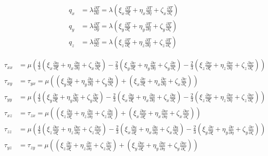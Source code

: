 \begin{align*}
q_x&=\lambda\frac{\partial T}{\partial x}=\lambda \left(\xi_x\frac{\partial T}{\partial \xi}+\eta_x\frac{\partial T}{\partial \eta}+\zeta_x\frac{\partial T}{\partial \zeta}\right)
\\
q_y&=\lambda\frac{\partial T}{\partial y}=\lambda \left(\xi_y\frac{\partial T}{\partial \xi}+\eta_y\frac{\partial T}{\partial \eta}+\zeta_y\frac{\partial T}{\partial \zeta}\right)
\\
q_z&=\lambda\frac{\partial T}{\partial z}=\lambda \left(\xi_z\frac{\partial T}{\partial \xi}+\eta_z\frac{\partial T}{\partial \eta}+\zeta_z\frac{\partial T}{\partial \zeta}\right)
\end{align*}

\begin{align*}
\tau_{xx}&=
\mu \left(\frac{4}{3}\left(\xi_x\frac{\partial u}{\partial \xi}+\eta_x\frac{\partial u}{\partial \eta}+\zeta_x\frac{\partial u}{\partial \zeta}\right)-\frac{2}{3}\left(\xi_y\frac{\partial v}{\partial \xi}+\eta_y\frac{\partial v}{\partial \eta}+\zeta_y\frac{\partial v}{\partial \zeta}\right)-\frac{2}{3}\left(\xi_z\frac{\partial w}{\partial \xi}+\eta_z\frac{\partial w}{\partial \eta}+\zeta_z\frac{\partial w}{\partial \zeta}\right) \right)
\\
\tau_{xy}&=\tau_{yx}=
\mu \left(\left(\xi_y\frac{\partial u}{\partial \xi}+\eta_y\frac{\partial u}{\partial \eta}+\zeta_y\frac{\partial u}{\partial \zeta}\right)+\left(\xi_x\frac{\partial v}{\partial \xi}+\eta_x\frac{\partial v}{\partial \eta}+\zeta_x\frac{\partial v}{\partial \zeta}\right) \right)
\\
\tau_{yy}&=
\mu \left(\frac{4}{3}\left(\xi_y\frac{\partial v}{\partial \xi}+\eta_y\frac{\partial v}{\partial \eta}+\zeta_y\frac{\partial v}{\partial \zeta}\right)-\frac{2}{3}\left(\xi_x\frac{\partial u}{\partial \xi}+\eta_x\frac{\partial u}{\partial \eta}+\zeta_x\frac{\partial u}{\partial \zeta}\right)-\frac{2}{3}\left(\xi_z\frac{\partial w}{\partial \xi}+\eta_z\frac{\partial w}{\partial \eta}+\zeta_z\frac{\partial w}{\partial \zeta}\right) \right)
\\
\tau_{xz}&=\tau_{zx}=
\mu \left(\left(\xi_z\frac{\partial u}{\partial \xi}+\eta_z\frac{\partial u}{\partial \eta}+\zeta_z\frac{\partial u}{\partial \zeta}\right)+\left(\xi_x\frac{\partial w}{\partial \xi}+\eta_x\frac{\partial w}{\partial \eta}+\zeta_x\frac{\partial w}{\partial \zeta}\right) \right)
\\
\tau_{zz}&=
\mu \left(\frac{4}{3}\left(\xi_z\frac{\partial w}{\partial \xi}+\eta_z\frac{\partial w}{\partial \eta}+\zeta_z\frac{\partial w}{\partial \zeta}\right)-\frac{2}{3}\left(\xi_x\frac{\partial u}{\partial \xi}+\eta_x\frac{\partial u}{\partial \eta}+\zeta_x\frac{\partial u}{\partial \zeta}\right)-\frac{2}{3}\left(\xi_y\frac{\partial v}{\partial \xi}+\eta_y\frac{\partial v}{\partial \eta}+\zeta_y\frac{\partial v}{\partial \zeta}\right) \right)
\\
\tau_{yz}&=\tau_{zy}=
\mu \left(\left(\xi_z\frac{\partial v}{\partial \xi}+\eta_z\frac{\partial v}{\partial \eta}+\zeta_z\frac{\partial v}{\partial \zeta}\right)+\left(\xi_y\frac{\partial w}{\partial \xi}+\eta_y\frac{\partial w}{\partial \eta}+\zeta_y\frac{\partial w}{\partial \zeta}\right) \right)
\end{align*}
